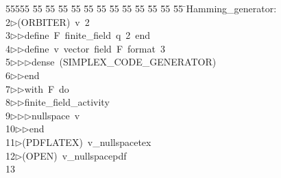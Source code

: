 %
%
\begin{tabbing}
55555 \= 55 \= 55 \= 55 \= 55 \= 55 \= 55 \= 55 \= 55 \= 55 \= 55 \= 55 \= 55 \= \>Hamming\_generator:\\[0pt]
2\>$\triangleright$\>(ORBITER)\ v\ 2\ \\[0pt]
3\>$\triangleright$\>$\triangleright$\>define\ F\ finite\_field\ q\ 2\ end\ \\[0pt]
4\>$\triangleright$\>$\triangleright$\>define\ v\ vector\ field\ F\ format\ 3\ \\[0pt]
5\>$\triangleright$\>$\triangleright$\>$\triangleright$\>dense\ (SIMPLEX\_CODE\_GENERATOR)\ \\[0pt]
6\>$\triangleright$\>$\triangleright$\>end\ \\[0pt]
7\>$\triangleright$\>$\triangleright$\>with\ F\ do\ \\[0pt]
8\>$\triangleright$\>$\triangleright$\>finite\_field\_activity\ \\[0pt]
9\>$\triangleright$\>$\triangleright$\>$\triangleright$\>nullspace\ v\ \\[0pt]
10\>$\triangleright$\>$\triangleright$\>end\\[0pt]
11\>$\triangleright$\>(PDFLATEX)\ v\_nullspacetex\\[0pt]
12\>$\triangleright$\>(OPEN)\ v\_nullspacepdf\\[0pt]
13\>\end{tabbing}
